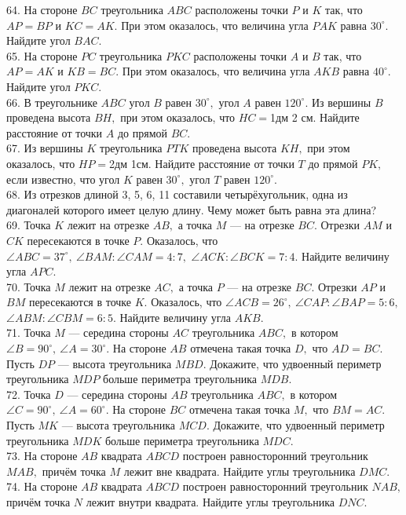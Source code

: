 \documentclass[12pt]{article}
\begin{document}
64. На стороне $BC$ треугольника $ABC$ расположены точки $P$ и $K$ так, что $AP=BP$ и $KC=AK.$ При этом оказалось, что величина угла $PAK$ равна $30^\circ.$ Найдите угол $BAC.$\\
65. На стороне $PC$ треугольника $PKC$ расположены точки $A$ и $B$ так, что $AP=AK$ и $KB=BC.$ При этом оказалось, что величина угла $AKB$ равна $40^\circ.$ Найдите угол $PKC.$\\
66. В треугольнике $ABC$ угол $B$ равен $30^\circ,$ угол $A$ равен $120^\circ.$ Из вершины $B$ проведена высота $BH,$ при этом оказалось, что $HC=$1дм 2 см. Найдите расстояние от точки $A$ до прямой $BC.$\\
67. Из вершины $K$ треугольника $PTK$ проведена высота $KH,$ при этом оказалось, что $HP=$2дм 1см. Найдите расстояние от точки $T$ до прямой $PK,$ если известно, что угол $K$ равен $30^\circ,$ угол $T$ равен $120^\circ.$\\
68. Из отрезков длиной 3, 5, 6, 11 составили четырёхугольник, одна из диагоналей которого имеет целую длину. Чему может быть равна эта длина?\\
69. Точка $K$ лежит на отрезке $AB,$ а точка $M$ --- на отрезке $BC.$ Отрезки $AM$ и $CK$ пересекаются в точке $P.$ Оказалось, что $\angle ABC=37^\circ,\ \angle BAM : \angle CAM=4:7,$ $\angle ACK: \angle BCK=7:4.$ Найдите величину угла $APC.$\\
70. Точка $M$ лежит на отрезке $AC,$ а точка $P$ --- на отрезке $BC.$ Отрезки $AP$ и $BM$ пересекаются в точке $K.$ Оказалось, что $\angle ACB=26^\circ,\ \angle CAP : \angle BAP=5:6,$ $\angle ABM: \angle CBM=6:5.$ Найдите величину угла $AKB.$\\
71. Точка $M$ --- середина стороны $AC$ треугольника $ABC,$ в котором $\angle B=90^\circ,\ \angle A=30^{\circ}.$ На стороне $AB$ отмечена такая точка $D,$ что $AD=BC.$ Пусть $DP$ --- высота треугольника $MBD.$ Докажите, что удвоенный периметр треугольника $MDP$ больше периметра треугольника $MDB.$\\
72. Точка $D$ --- середина стороны $AB$ треугольника $ABC,$ в котором $\angle C=90^{\circ},\ \angle A=60^{\circ}.$ На стороне $BC$ отмечена такая точка $M,$ что $BM=AC.$ Пусть $MK$ --- высота треугольника $MCD.$ Докажите, что удвоенный периметр треугольника $MDK$ больше периметра треугольника $MDC.$\\
73. На стороне $AB$ квадрата $ABCD$ построен равносторонний треугольник $MAB,$ причём точка $M$ лежит вне квадрата. Найдите углы треугольника $DMC.$\\
74. На стороне $AB$ квадрата $ABCD$ построен равносторонний треугольник $NAB,$ причём точка $N$ лежит внутри квадрата. Найдите углы треугольника $DNC.$\\
\end{document}
